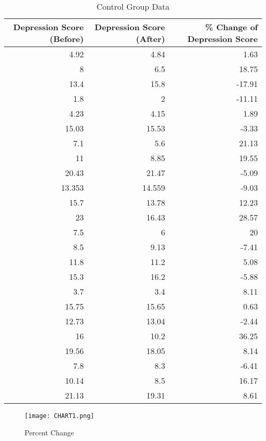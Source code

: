 \documentclass[12pt]{article}
\begin{document}
  \begin{table}[h!]
    \small
    \caption{Control Group Data}
    \label{tab:2}
  \centering
  \begin{tabular}{rrr}
      \toprule
  Depression Score (Before) & Depression Score (After) & \% Change of Depression Score \\ 
    \midrule
     4.92 & 4.84 & 1.63\\ 
     8 & 6.5 & 18.75\\ 
     13.4 & 15.8 & -17.91\\ 
     1.8 & 2 & -11.11\\ 
     4.23 & 4.15 & 1.89\\ 
     15.03 & 15.53 & -3.33\\  
     7.1 & 5.6 & 21.13\\
     11 & 8.85 & 19.55\\
     20.43 & 21.47 & -5.09\\
     13.353 & 14.559 & -9.03\\
     15.7 & 13.78 & 12.23\\
     23 & 16.43 & 28.57\\
     7.5 & 6 & 20\\
     8.5 & 9.13 & -7.41\\
     11.8 & 11.2 & 5.08\\
     15.3 & 16.2 & -5.88\\
     3.7 & 3.4 & 8.11\\
     15.75 & 15.65 & 0.63\\
     12.73 & 13.04 & -2.44\\
     16 & 10.2 & 36.25\\
     19.56 & 18.05 & 8.14\\
     7.8 & 8.3 & -6.41\\
     10.14 & 8.5 & 16.17\\
     21.13 & 19.31 & 8.61\\
     \bottomrule
  \end{tabular}
  \end{table}

  \newpage

  \begin{figure}[h!]
    \centering
    \texttt{[image: CHART1.png]}
    \label{fig:chart1}
    \caption{Percent Change}
  \end{figure}
\end{document}
